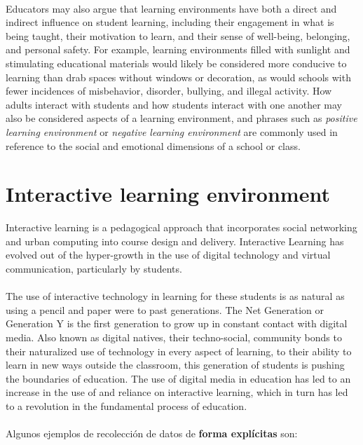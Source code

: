 \documentclass[12pt,letterpaper,oneside] {memoir}
\begin{document}
\paragraph{} 
Educators may also argue that learning environments have both a direct and indirect influence on student learning, including their engagement in what is being taught, their motivation to learn, and their sense of well-being, belonging, and personal safety. For example, learning environments filled with sunlight and stimulating educational materials would likely be considered more conducive to learning than drab spaces without windows or decoration, as would schools with fewer incidences of misbehavior, disorder, bullying, and illegal activity. How adults interact with students and how students interact with one another may also be considered aspects of a learning environment, and phrases such as \textit{positive learning environment} or \textit{negative learning environment} are commonly used in reference to the social and emotional dimensions of a school or class.
\paragraph{}
\section{Interactive learning environment}
 Interactive learning is a pedagogical approach that incorporates  social networking and urban computing into course design and delivery. Interactive Learning has evolved out of the hyper-growth in the use of digital technology and virtual communication, particularly by students. 
\paragraph{}
The use of interactive technology in learning for these students is as natural as using a pencil and paper were to past generations. The Net Generation or Generation Y is the first generation to grow up in constant contact with digital media. Also known as digital natives, their techno-social, community bonds to their naturalized use of technology in every aspect of learning, to their ability to learn in new ways outside the classroom, this generation of students is pushing the boundaries of education. The use of digital media in education has led to an increase in the use of and reliance on interactive learning, which in turn has led to a revolution in the fundamental process of education.\paragraph{}
Algunos ejemplos de recolección de datos de \textbf{forma explícitas} son:
\end{document}
